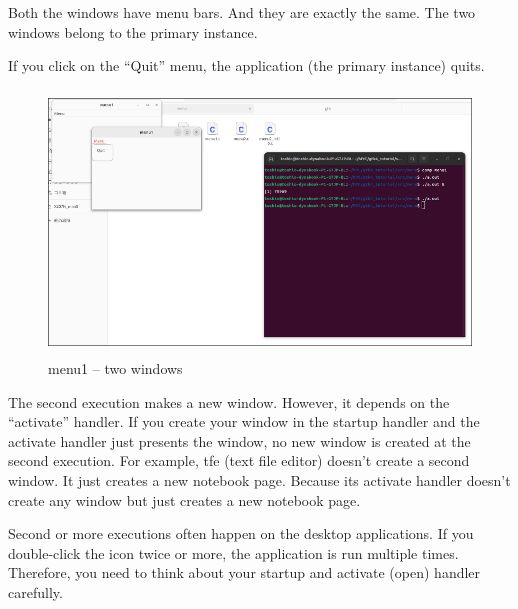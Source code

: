 Both the windows have menu bars. And they are exactly the same. The two
windows belong to the primary instance.

If you click on the ``Quit'' menu, the application (the primary
instance) quits.

\begin{figure}
\centering
\includegraphics[width=12cm,height=7cm]{../image/menu1_two_windows.png}
\caption{menu1 -- two windows}
\end{figure}

The second execution makes a new window. However, it depends on the
``activate'' handler. If you create your window in the startup handler
and the activate handler just presents the window, no new window is
created at the second execution. For example, tfe (text file editor)
doesn't create a second window. It just creates a new notebook page.
Because its activate handler doesn't create any window but just creates
a new notebook page.

Second or more executions often happen on the desktop applications. If
you double-click the icon twice or more, the application is run multiple
times. Therefore, you need to think about your startup and activate
(open) handler carefully.
